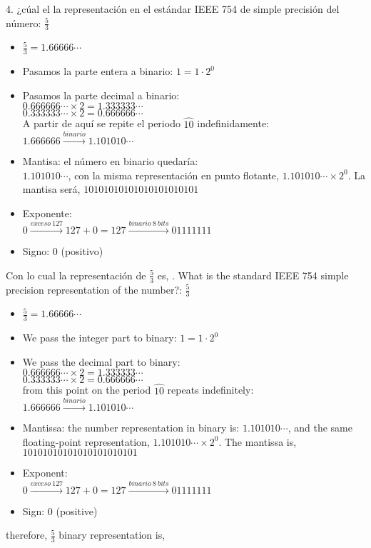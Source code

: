 \begin{paracol}{2}
4. ¿cúal el la representación en el estándar IEEE 754 de simple precisión del número: $\frac{5}{3}$
\begin{itemize}[leftmargin=\dimexpr 26pt-.25in]
\item $\frac{5}{3}=1.66666\cdots$
\item Pasamos la parte entera a binario: $1=1\cdot 2^0$
\item Pasamos la parte decimal a binario:\\
$0.666666\cdots\times 2=1.333333\cdots$\\
$0.333333\cdots\times 2=0.666666\cdots$\\
A partir de aquí se repite el periodo $\widehat{10}$ indefinidamente: $1.666666  \xrightarrow{binario} 1.101010\cdots$ 
\item Mantisa: el número en binario quedaría:\\
$1.101010 \cdots$, con la misma representación en punto flotante, $1.101010\cdots \times 2^0$. La mantisa será, $10101010101010101010101$

\item Exponente:\\
$0 \xrightarrow{exceso\ 127} 127+0=127  \xrightarrow{binario \ 8 \ bits} 01111111$
\item Signo: 0 (positivo)
\end{itemize}
Con lo cual la representación de $\frac{5}{3}$ es,
. What is the standard IEEE 754 simple precision representation of  the number?: $\frac{5}{3}$
\begin{itemize}[leftmargin=\dimexpr 26pt-.25in]
\item $\frac{5}{3}=1.66666\cdots$
\item We pass the integer part to binary: $1=1\cdot 2^0$
\item We pass the decimal part to binary:\\
$0.666666\cdots\times 2=1.333333\cdots$\\
$0.333333\cdots\times 2=0.666666\cdots$\\
from this point on the period $\widehat{10}$ repeats indefinitely: $1.666666  \xrightarrow{binario} 1.101010\cdots$ 
\item Mantissa: the number representation in binary is: $1.101010 \cdots$, and the same floating-point representation, $1.101010\cdots \times 2^0$. The mantissa is, $10101010101010101010101$

\item Exponent:\\
$0 \xrightarrow{exceso\ 127} 127+0=127  \xrightarrow{binario \ 8 \ bits} 01111111$
\item Sign: 0 (positive)
\end{itemize}
therefore, $\frac{5}{3}$ binary representation is,
\end{paracol}
